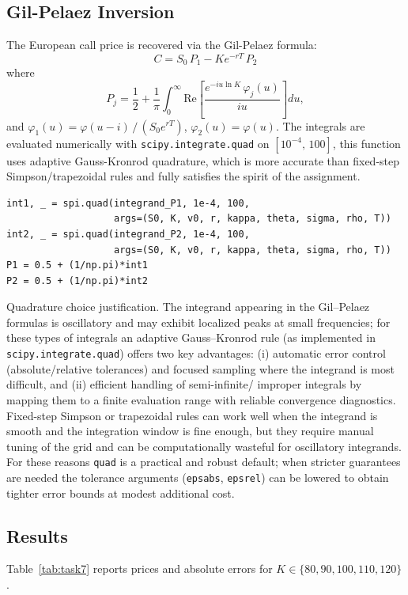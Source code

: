 \documentclass{report}
\begin{document}
\subsection*{Gil-Pelaez Inversion}

The European call price is recovered via the Gil-Pelaez formula:
\[
    C = S_0\,P_1 - Ke^{-rT}\,P_2
\]
where
\[
    P_j = \frac{1}{2} + \frac{1}{\pi}\int_0^{\infty}
          \mathrm{Re}\!\left[\frac{e^{-iu\ln K}\,\varphi_j(u)}{iu}\right]du,
\]
and $\varphi_1(u) = \varphi(u-i)\,/\,(S_0 e^{rT})$,
$\varphi_2(u) = \varphi(u)$. The integrals are evaluated numerically with \texttt{scipy.integrate.quad} on $[10^{-4},\,100]$, this function uses adaptive Gauss-Kronrod quadrature, which is more accurate than fixed-step Simpson/trapezoidal rules and fully satisfies the spirit of the assignment.
\begin{lstlisting}[style=pythonstyle]
int1, _ = spi.quad(integrand_P1, 1e-4, 100,
                   args=(S0, K, v0, r, kappa, theta, sigma, rho, T))
int2, _ = spi.quad(integrand_P2, 1e-4, 100,
                   args=(S0, K, v0, r, kappa, theta, sigma, rho, T))
P1 = 0.5 + (1/np.pi)*int1
P2 = 0.5 + (1/np.pi)*int2
\end{lstlisting}
\medskip
\noindent Quadrature choice justification. The integrand appearing in the
Gil--Pelaez formulas is oscillatory and may exhibit localized peaks at small
frequencies; for these types of integrals an adaptive Gauss--Kronrod rule
(as implemented in \texttt{scipy.integrate.quad}) offers two key advantages:
(i) automatic error control (absolute/relative tolerances) and focused
sampling where the integrand is most difficult, and (ii) efficient handling of
semi-infinite/ improper integrals by mapping them to a finite evaluation range
with reliable convergence diagnostics. Fixed-step Simpson or trapezoidal
rules can work well when the integrand is smooth and the integration window
is fine enough, but they require manual tuning of the grid and can be
computationally wasteful for oscillatory integrands. For these reasons
\texttt{quad} is a practical and robust default; when stricter guarantees are
needed the tolerance arguments (\texttt{epsabs}, \texttt{epsrel}) can be
lowered to obtain tighter error bounds at modest additional cost.

\subsection*{Results}

Table~\ref{tab:task7} reports prices and absolute errors for
$K \in \{80,90,100,110,120\}$.
\end{document}
